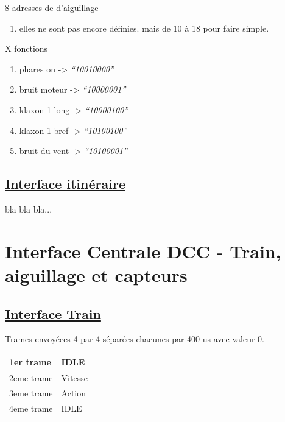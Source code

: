 \bigskip

8 adresses de d'aiguillage
\begin {enumerate}
\item elles ne sont pas encore définies. mais de 10 à 18 pour faire simple.
\end {enumerate}  

\bigskip

X fonctions
\begin {enumerate}
\item phares on     -> \emph{``10010000''}
\item bruit moteur  -> \emph{``10000001''}
\item klaxon 1 long -> \emph{``10000100''}
\item klaxon 1 bref -> \emph{``10100100''}
\item bruit du vent -> \emph{``10100001''}
\end {enumerate}  

\bigskip

\subsection{\underline{Interface itinéraire}}
\label{sec:ihm_iti}

bla bla bla...

\newpage

\section{Interface Centrale DCC - Train, aiguillage et capteurs}
\label{sec:int_dcc}

\subsection{\underline{Interface Train}}
\label{sec:int_train}

\bigskip
Trames envoyéees 4 par 4 séparées chacunes par 400 us avec valeur 0.
\begin{center}
\begin{tabular}{|l|l|l|}
  \hline
  1er trame & IDLE \\
  \hline
  2eme trame & Vitesse \\
  \hline
  3eme trame & Action \\
  \hline
  4eme trame & IDLE \\
  \hline
\end{tabular}
\end{center}

